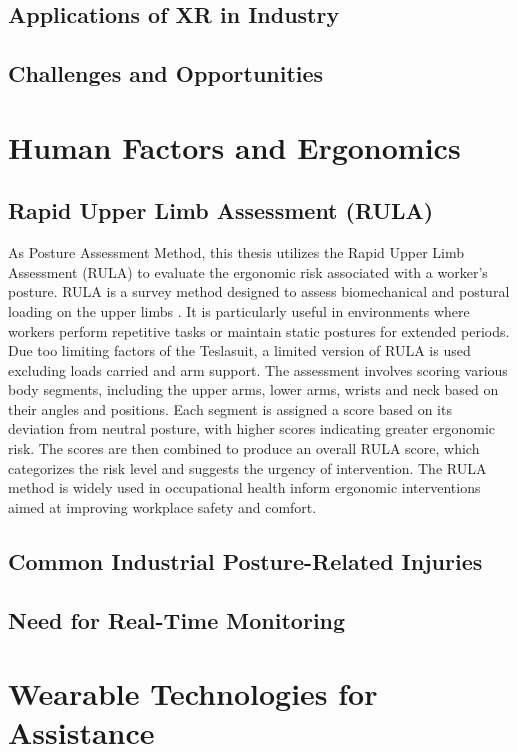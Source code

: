 \subsection{Applications of XR in Industry}


\subsection{Challenges and Opportunities}

\section{Human Factors and Ergonomics}
\subsection{Rapid Upper Limb Assessment (RULA)}
As Posture Assessment Method, this thesis utilizes the Rapid Upper Limb Assessment (RULA) to evaluate the ergonomic risk associated with a worker's posture. RULA is a survey method designed to assess biomechanical and postural loading on the upper limbs \cite{MCATAMNEY199391}. It is particularly useful in environments where workers perform repetitive tasks or maintain static postures for extended periods. Due too limiting factors of the Teslasuit, a limited version of RULA is used excluding loads carried and arm support. The assessment involves scoring various body segments, including the upper arms, lower arms, wrists and neck based on their angles and positions. Each segment is assigned a score based on its deviation from neutral posture, with higher scores indicating greater ergonomic risk. The scores are then combined to produce an overall RULA score, which categorizes the risk level and suggests the urgency of intervention. The RULA method is widely used in occupational health inform ergonomic interventions aimed at improving workplace safety and comfort.

\subsection{Common Industrial Posture-Related Injuries}

\subsection{Need for Real-Time Monitoring}

\section{Wearable Technologies for Assistance}

